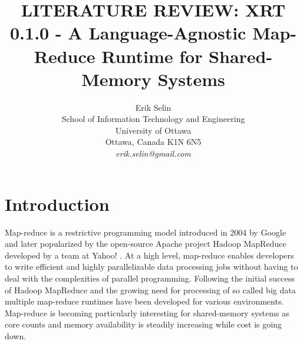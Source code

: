 \documentclass[11pt]{article}       %
\begin{document}


\title{LITERATURE REVIEW: XRT 0.1.0 - A Language-Agnostic Map-Reduce Runtime for
Shared-Memory Systems}


\author{
Erik Selin\\
School of Information Technology and Engineering\\
University of Ottawa\\
Ottawa, Canada K1N 6N5 \\
{\em erik.selin@gmail.com}
} %

\maketitle

\section{Introduction} \label{intro}


Map-reduce is a restrictive programming model introduced in 2004 by Google
\cite{dean2004mapreduce} and later popularized by the open-source Apache project
Hadoop MapReduce developed by a team at Yahoo! \cite{Hadoop}. At a high level,
map-reduce enables developers to write efficient and highly parallelizable data
processing jobs without having to deal with the complexities of parallel
programming. Following the initial success of Hadoop MapReduce and the growing
need for processing of so called big data multiple map-reduce runtimes have been
developed for various environments. Map-reduce is becoming particularly
interesting for shared-memory systems as core counts and memory availability is
steadily increasing while cost is going down.
\end{document}
